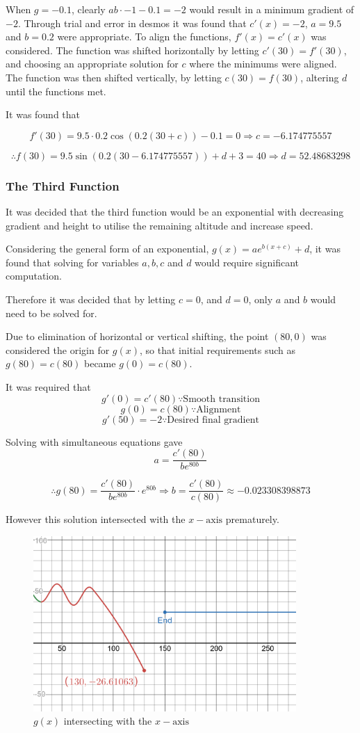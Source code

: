 \documentclass[10pt, letterpaper]{article}
\begin{document}
When $g=-0.1$, clearly $ab\cdot -1-0.1=-2$ would result in a minimum gradient of $-2$. Through trial and error in desmos it was found that $c'(x)=-2$, $a=9.5$ and $b=0.2$ were appropriate. To align the functions, $f'(x)=c'(x)$ was considered. The function was shifted horizontally by letting $c'(30)=f'(30)$, and choosing an appropriate solution for $c$ where the minimums were aligned. The function was then shifted vertically, by letting $c(30)=f(30)$, altering $d$ until the functions met.  

It was found  that

 $$f'(30)=9.5\cdot0.2\cos (0.2(30+c))-0.1=0 \Rightarrow c=-6.174775557$$

$$\therefore f(30)=9.5\sin(0.2(30-6.174775557))+d+3=40 \Rightarrow d=52.48683298$$

\subsubsection{The Third Function}
It was decided that the third function would be an exponential with decreasing gradient and height to utilise the remaining altitude and increase speed.

Considering the general form of an exponential, $g(x)=ae^{b(x+c)}+d$, it was found that solving for variables $a, b, c$ and $d$ would require significant computation.

Therefore it was decided that by letting $c=0$, and $d=0$, only $a$ and $b$ would need to be solved for. 

Due to elimination of horizontal or vertical shifting, the point $(80, 0)$ was considered the origin for $g(x)$, so that  initial requirements such as $g(80)=c(80)$ became $g(0)=c(80)$. 

It was required that 
$$g'(0)=c'(80) \because \textrm{Smooth transition}$$
$$g(0)=c(80)\because \textrm{Alignment}$$ 
$$g'(50)=-2\because \textrm{Desired final gradient}$$

Solving with simultaneous equations gave 
$$a=\frac{c'(80)}{be^{80b}}$$ 

$$\therefore g(80)=\frac{c'(80)}{be^{80b}}\cdot e^{80b}\Rightarrow b=\frac{c'(80)}{c(80)}\approx -0.023308398873$$

However this solution intersected with the $x-\textrm{axis}$ prematurely. 
	\begin{figure}[h]
		\centering
		\includegraphics[width=10cm]{PrematureIntersecion.png}
		\caption{$g(x)$ intersecting with the $x-\textrm{axis}$}
	\end{figure}
\end{document}
